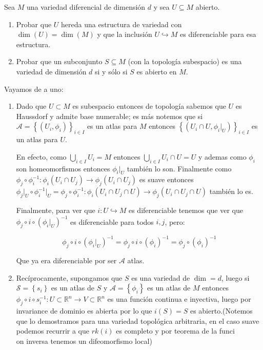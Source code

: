 \documentclass[11pt]{article}
\newcommand{\A}{\mathcal{A}}
\newcommand{\inc}{\hookrightarrow}
\newcommand{\R}{{\mathbb{R}}}
\newcommand{\sett}[1]{\left\lbrace#1\right\rbrace}
\newcommand{\Bigcup}[2]{\bigcup\limits_{#1}{#2}}
\numberwithin{theorem}{subsection}
\newcommand{\qed}{\nobreak \ifvmode \relax \else
	\ifdim\lastskip<1.5em \hskip-\lastskip
	\hskip1.5em plus0em minus0.5em \fi \nobreak
	\vrule height0.75em width0.5em depth0.25em\fi}
\begin{document}
\begin{question}
	Sea $M$ una variedad diferencial de dimensi\'on $d$ y sea $U\subseteq M$ abierto. 
	\begin{enumerate}
		\item Probar que $U$ hereda una estructura de variedad con $\dim(U)=\dim(M)$ y que la inclusi\'on $U\hookrightarrow M$ es diferenciable para esa estructura.
		\item Probar que un subconjunto $S\subseteq M$ (con la topolog\'ia subespacio) es una variedad de dimensi\'on $d$ si y s\'olo si $S$ es abierto en $M$.
	\end{enumerate}
\end{question}

\begin{solution}
	Vayamos de a uno:
	
	\begin{enumerate}
		\item Dado que $U \subset M$ es subespacio entonces de topolog\'ia sabemos que $U$ es Haussdorf y admite base numerable; es m\'as notemos que si $\A = \sett{(U_i, \phi_i)}_{i \in I}$ es un atlas para $M$ entonces $\sett{(U_i \cap U, \phi_i \vert_{U})}_{i \in I}$ es un atlas para $U$.
		
		En efecto, como $\Bigcup{i \in I}{U_i} = M$ entonces $\Bigcup{i \in I}{U_i \cap U} = U$ y ademas como $\phi_i$ son homeomorfismos entonces $\phi_i\vert_{U}$ tambi\'en lo son. Finalmente como $\phi_j \circ \phi_i^{-1} : \phi_i(U_i \cap U_j) \rightarrow \phi_j(U_i \cap U_j)$ es suave entonces $\phi_j \vert_{U} \circ \phi_i^{-1} \vert_U = \phi_j \circ \phi_i^{-1} : \phi_i(U_i \cap U_j \cap U) \rightarrow \phi_j(U_i \cap U_j \cap U) $ tambi\'en lo es.
		
		Finalmente, para ver que $i : U \inc M$ es diferenciable tenemos que ver que $\phi_j \circ i \circ \left(\phi_i \vert_{U}\right)^{-1}$ es diferenciable para todos $i,j$, pero:
		
		\begin{equation*}
			\phi_j \circ i \circ \left(\phi_i \vert_{U}\right)^{-1} = \phi_j \circ i \circ \left(\phi_i \right)^{-1} = \phi_j \circ \left(\phi_i \right)^{-1}
		\end{equation*}
		
		Que ya era diferenciable por ser $\A$ atlas.
		
		\item Rec\'iprocamente, supongamos que $S$ es una variedad de $\dim = d$, luego si $\mathcal{S} = \sett{s_i}$ es un atlas de $S$ y $\A = \sett{\phi_i}$ es un atlas de $M$ entonces $\phi_j \circ i \circ s_i^{-1}: U \subset \R^n \rightarrow V \subset \R^n$ es una funci\'on continua e inyectiva, luego por invariance de dominio es abierta por lo que $i(S) = S$ es abierto.(Notemos que lo demostramos para una variedad topol\'ogica arbitraria, en el caso suave podemos recurrir a que $rk (i)$ es completo y por teorema de la funci\\on inversa tenemos un difeomorfismo local) \qed
		
	\end{enumerate}
	
\end{solution}
\end{document}
